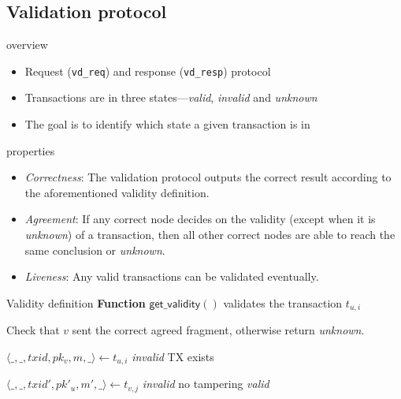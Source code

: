 \documentclass{beamer}
\begin{document}
\subsection{Validation protocol}
\begin{frame}{\subsecname overview}
\begin{itemize}
\item Request (\texttt{vd\_req}) and response (\texttt{vd\_resp}) protocol
\item Transactions are in three states---\emph{valid}, \emph{invalid} and \emph{unknown}
\item The goal is to identify which state a given transaction is in
\end{itemize}
\end{frame}

\begin{frame}{\subsecname properties}
\begin{itemize}
    \item \emph{Correctness}:
        The validation protocol outputs the correct result
        according to the aforementioned validity definition.
    \item \emph{Agreement}:
        If any correct node decides on the validity (except when it is \emph{unknown}) of a transaction,
        then all other correct nodes are able to reach the same conclusion or \emph{unknown}.
    \item \emph{Liveness}:
        Any valid transactions can be validated eventually.
\end{itemize}
\end{frame}

\begin{frame}{Validity definition}
\textbf{Function} $\textsf{get\_validity}()$ validates the transaction $t_{u, i}$
\vspace{5 mm}
\begin{algorithmic}
    \State Check that $v$ sent the correct agreed fragment,
    otherwise return \emph{unknown}.

    \State
    \State $\langle \_, \_, txid, pk_v, m, \_ \rangle \gets t_{u, i}$
        \State \Return \emph{invalid}
    \EndIf
    \State \Comment TX exists 

    \State $\langle \_, \_, txid', pk'_u, m', \_ \rangle \gets t_{v, j}$
        \State \Return \emph{invalid}
    \EndIf
    \State \Comment no tampering
    \State \Return \emph{valid}
\end{algorithmic}
\end{frame}
\end{document}
